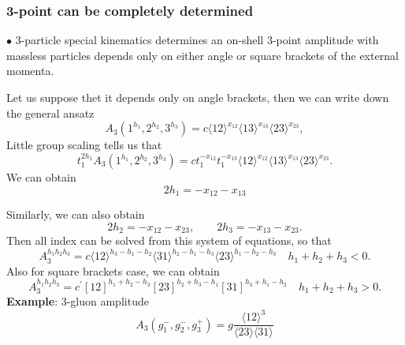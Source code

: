 \documentclass{beamer}
\newcommand{\avg}[1]{\langle #1 \rangle}
\begin{document}
\begin{frame}
    \frametitle{3-point can be completely determined}
    $\bullet$ 3-particle special kinematics determines an on-shell 3-point amplitude with massless particles depends only on either angle or square brackets of the external momenta.

    Let us suppose thet it depends only on angle brackets, then we can write down the general ansatz
    \begin{equation*}
        A_3(1^{h_1},2^{h_2},3^{h_3})=c\avg{12}^{x_{12}}\avg{13}^{x_{13}}\avg{23}^{x_{23}},
    \end{equation*}
    Little group scaling tells us that
    \begin{equation*}
        t_1^{2h_1} A_3(1^{h_1},2^{h_2},3^{h_3})=ct_1^{-x_{12}}t_1^{-x_{13}}\avg{12}^{x_{12}}\avg{13}^{x_{13}}\avg{23}^{x_{23}}.
    \end{equation*}
    We can obtain
    \begin{equation*}
        2h_1=-x_{12}-x_{13}
    \end{equation*}
\end{frame}

\begin{frame}
    Similarly, we can also obtain
    \begin{equation*}
        2h_2=-x_{12}-x_{23},\qquad 2h_3=-x_{13}-x_{23}.
    \end{equation*}
    Then all index can be solved from this system of equations, so that
    \begin{equation*}
        A_3^{h_1h_2h_3}=c\avg{12}^{h_3-h_1-h_2}\avg{31}^{h_2-h_1-h_3}\avg{23}^{h_1-h_2-h_3}\quad h_1+h_2+h_3<0.
    \end{equation*}
    Also for square brackets case, we can obtain
    \begin{equation*}
        A_3^{h_1h_2h_3}=c^{'}[12]^{h_1+h_2-h_3}[23]^{h_2+h_3-h_1}[31]^{h_3+h_1-h_2}\quad h_1+h_2+h_3>0.
    \end{equation*}
    \textbf{Example}: 3-gluon amplitude\\
    \begin{equation*}
        A_3(g_1^-,g_2^-,g_3^+)=g\frac{\avg{12}^3}{\avg{23}\!\avg{31}}
    \end{equation*}
\end{frame}
\end{document}
